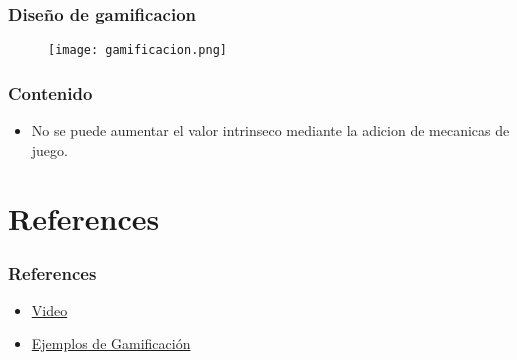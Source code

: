 \documentclass[11pt]{beamer}
\begin{document}
\begin{frame}
\frametitle{Diseño de gamificacion}
\begin{itemize}
    \begin{figure}
        \texttt{[image: gamificacion.png]}
        \label{fig:my_label}
    \end{figure}
\end{itemize}
\end{frame}



\begin{frame}
\frametitle{Contenido}
\begin{itemize}
    \item No se puede aumentar el valor intrinseco mediante la adicion de mecanicas de juego.
\end{itemize}
\end{frame}



\section{References}
\begin{frame}

\frametitle{References}
\begin{itemize}
\item \href{https://www.youtube.com/watch?v=v23kdMadKQA}{Video}
\item \href{https://www.evirtualplus.com/herramientas-de-gamificacion-para-universitarios/}{Ejemplos de Gamificación}
\end{itemize}
\end{frame}
\end{document}
